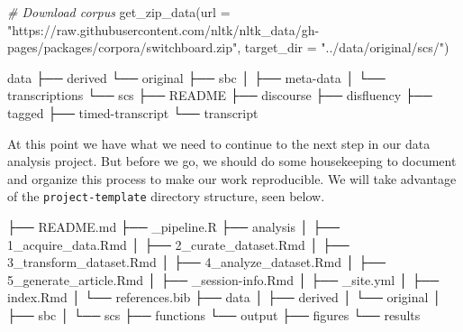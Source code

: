 \documentclass[
  letterpaper,
]{scrbook}
\newenvironment{Shaded}{\begin{snugshade}}{\end{snugshade}}
\newcommand{\AttributeTok}[1]{\textcolor[rgb]{0.00,0.00,0.00}{#1}}
\newcommand{\CommentTok}[1]{\textcolor[rgb]{0.00,0.00,0.00}{\textit{#1}}}
\newcommand{\ExtensionTok}[1]{\textcolor[rgb]{0.00,0.00,0.00}{#1}}
\newcommand{\FunctionTok}[1]{\textcolor[rgb]{0.00,0.00,0.00}{#1}}
\newcommand{\NormalTok}[1]{\textcolor[rgb]{0.00,0.00,0.00}{#1}}
\newcommand{\StringTok}[1]{\textcolor[rgb]{0.00,0.00,0.00}{#1}}
\begin{document}
\begin{Shaded}
\begin{Highlighting}[]
\CommentTok{\# Download corpus}
\FunctionTok{get\_zip\_data}\NormalTok{(}\AttributeTok{url =} \StringTok{"https://raw.githubusercontent.com/nltk/nltk\_data/gh{-}pages/packages/corpora/switchboard.zip"}\NormalTok{, }\AttributeTok{target\_dir =} \StringTok{"../data/original/scs/"}\NormalTok{)}
\end{Highlighting}
\end{Shaded}

\begin{Shaded}
\begin{Highlighting}[]
\ExtensionTok{data}
\ExtensionTok{├──}\NormalTok{ derived}
\ExtensionTok{└──}\NormalTok{ original}
    \ExtensionTok{├──}\NormalTok{ sbc}
    \ExtensionTok{│}\NormalTok{   ├── meta{-}data}
    \ExtensionTok{│}\NormalTok{   └── transcriptions}
    \ExtensionTok{└──}\NormalTok{ scs}
        \ExtensionTok{├──}\NormalTok{ README}
        \ExtensionTok{├──}\NormalTok{ discourse}
        \ExtensionTok{├──}\NormalTok{ disfluency}
        \ExtensionTok{├──}\NormalTok{ tagged}
        \ExtensionTok{├──}\NormalTok{ timed{-}transcript}
        \ExtensionTok{└──}\NormalTok{ transcript}
\end{Highlighting}
\end{Shaded}

At this point we have what we need to continue to the next step in our
data analysis project. But before we go, we should do some housekeeping
to document and organize this process to make our work reproducible. We
will take advantage of the \texttt{project-template} directory
structure, seen below.

\begin{Shaded}
\begin{Highlighting}[]
\ExtensionTok{├──}\NormalTok{ README.md}
\ExtensionTok{├──}\NormalTok{ \_pipeline.R}
\ExtensionTok{├──}\NormalTok{ analysis}
\ExtensionTok{│}\NormalTok{   ├── 1\_acquire\_data.Rmd}
\ExtensionTok{│}\NormalTok{   ├── 2\_curate\_dataset.Rmd}
\ExtensionTok{│}\NormalTok{   ├── 3\_transform\_dataset.Rmd}
\ExtensionTok{│}\NormalTok{   ├── 4\_analyze\_dataset.Rmd}
\ExtensionTok{│}\NormalTok{   ├── 5\_generate\_article.Rmd}
\ExtensionTok{│}\NormalTok{   ├── \_session{-}info.Rmd}
\ExtensionTok{│}\NormalTok{   ├── \_site.yml}
\ExtensionTok{│}\NormalTok{   ├── index.Rmd}
\ExtensionTok{│}\NormalTok{   └── references.bib}
\ExtensionTok{├──}\NormalTok{ data}
\ExtensionTok{│}\NormalTok{   ├── derived}
\ExtensionTok{│}\NormalTok{   └── original}
\ExtensionTok{│}\NormalTok{       ├── sbc}
\ExtensionTok{│}\NormalTok{       └── scs}
\ExtensionTok{├──}\NormalTok{ functions}
\ExtensionTok{└──}\NormalTok{ output}
    \ExtensionTok{├──}\NormalTok{ figures}
    \ExtensionTok{└──}\NormalTok{ results}
\end{Highlighting}
\end{Shaded}
\end{document}
